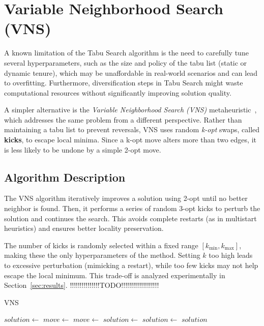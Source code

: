 \clearpage

\section{Variable Neighborhood Search (VNS)}

A known limitation of the Tabu Search algorithm is the need to carefully tune several hyperparameters, such as the size and policy 
of the tabu list (static or dynamic tenure), which may be unaffordable in real-world scenarios and can lead to overfitting. 
Furthermore, diversification steps in Tabu Search might waste computational resources without significantly improving solution quality.

A simpler alternative is the \textit{Variable Neighborhood Search (VNS)} metaheuristic~\cite{Hansen2009}, 
which addresses the same problem from a different perspective. Rather than maintaining a tabu list to prevent reversals, 
VNS uses random \textit{k-opt} swaps, called \textbf{kicks}, to escape local minima. Since a k-opt move alters more than two edges, 
it is less likely to be undone by a simple 2-opt move.

\subsection{Algorithm Description}

The VNS algorithm iteratively improves a solution using 2-opt until no better neighbor is found. Then, it performs a series of random 3-opt kicks 
to perturb the solution and continues the search. This avoids complete restarts (as in multistart heuristics) and ensures better locality preservation.

The number of kicks is randomly selected within a fixed range $[k_{\text{min}}, k_{\text{max}}]$, making these the only hyperparameters of the method. 
Setting $k$ too high leads to excessive perturbation (mimicking a restart), while too few kicks may not help escape the local minimum. 
This trade-off is analyzed experimentally in Section~\ref{sec:results}. !!!!!!!!!!!!!!!TODO!!!!!!!!!!!!!!!!!!!

\begin{algorithm}
\caption{VNS}
\label{alg:vns}
\begin{algorithmic}
    \State $solution \gets$ 
        \State $move \gets$ 
                \State $move \gets$ 
                \State $solution \gets$ 
            \EndFor
        \Else
            \State $solution \gets$ 
        \EndIf
    \EndWhile
    \State \Return $solution$
\EndProcedure
\end{algorithmic}
\end{algorithm}


